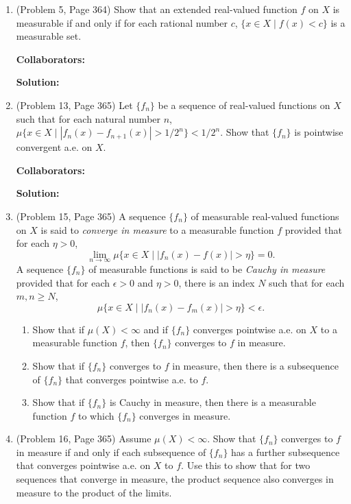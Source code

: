 \documentclass{article}%
\begin{document}
\begin{enumerate}
\item  (Problem 5, Page 364) Show that an extended real-valued function $f$ on $X$ is measurable if and only if for each rational number $c$, $\{x\in X \mid f(x)< c\}$ is a  measurable set.


\bigskip
\textbf{Collaborators:}\\
\smallskip
 
\textbf{Solution:}
\bigskip

\item (Problem 13, Page 365) Let $\{f_n\}$ be a sequence of real-valued functions on $X$ such that for each natural number $n$, $\mu \{x\in X \mid |f_n (x) - f_{n+1}(x)|> 1/2^n\}<1/2^n$. Show that $\{f_n\}$ is pointwise convergent a.e. on $X$.

\bigskip
\textbf{Collaborators:}\\
\smallskip
 
\textbf{Solution:}
\bigskip

\item  (Problem 15, Page 365)  A sequence $\{f_n\}$ of measurable real-valued functions on $X$ is said to \emph{converge in measure} to a measurable function $f$  provided that for each $\eta > 0$, \[
\lim_{n\to \infty} \mu\{x\in X \mid |f_n(x) - f(x)|>\eta \} = 0.\]A sequence $\{f_n\}$ of measurable functions is said to be \emph{Cauchy in measure} provided that for each $\epsilon > 0$ and $\eta > 0$, there is an index $N$ such that for each $m,n\geq N$, \[
\mu\{x\in X \mid |f_n(x) - f_m(x)| > \eta \} < \epsilon.\]
\begin{enumerate}
\item Show that if $\mu(X)< \infty$ and if $\{f_n\}$ converges pointwise a.e. on $X$ to a measurable function $f$, then $\{f_n\}$ converges to $f$ in measure.
\item Show that if $\{f_n\}$ converges to $f$ in measure, then there is a subsequence of $\{f_n\}$ that converges pointwise a.e. to $f$.
\item Show that if $\{f_n\}$ is Cauchy in measure, then there is a measurable function $f$ to which $\{f_n\}$ converges in measure.\end{enumerate}

\item (Problem 16, Page 365) Assume $\mu (X) < \infty$.  Show that $\{f_n\}$ converges to $f$ in measure if and only if each  subsequence of $\{f_n\}$ has a further subsequence that converges pointwise a.e. on $X$ to $f$.  Use this to show that for two sequences that converge in measure, the product sequence also converges in measure to the product of the limits. 


\end{enumerate}
\end{document}
